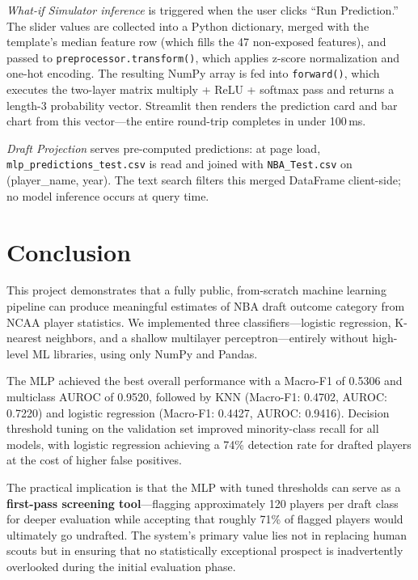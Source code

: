 \textit{What-if Simulator inference} is triggered when the user clicks ``Run Prediction.'' The slider values are collected into a Python dictionary, merged with the template's median feature row (which fills the 47 non-exposed features), and passed to \texttt{preprocessor.transform()}, which applies z-score normalization and one-hot encoding. The resulting NumPy array is fed into \texttt{forward()}, which executes the two-layer matrix multiply + ReLU + softmax pass and returns a length-3 probability vector. Streamlit then renders the prediction card and bar chart from this vector---the entire round-trip completes in under 100\,ms.

\textit{Draft Projection} serves pre-computed predictions: at page load, \texttt{mlp\_predictions\_test.csv} is read and joined with \texttt{NBA\_Test.csv} on (player\_name, year). The text search filters this merged DataFrame client-side; no model inference occurs at query time.



\section{Conclusion}

This project demonstrates that a fully public, from-scratch machine learning pipeline can produce meaningful estimates of NBA draft outcome category from NCAA player statistics. We implemented three classifiers---logistic regression, K-nearest neighbors, and a shallow multilayer perceptron---entirely without high-level ML libraries, using only NumPy and Pandas.

The MLP achieved the best overall performance with a Macro-F1 of 0.5306 and multiclass AUROC of 0.9520, followed by KNN (Macro-F1: 0.4702, AUROC: 0.7220) and logistic regression (Macro-F1: 0.4427, AUROC: 0.9416). Decision threshold tuning on the validation set improved minority-class recall for all models, with logistic regression achieving a 74\% detection rate for drafted players at the cost of higher false positives.

The practical implication is that the MLP with tuned thresholds can serve as a \textbf{first-pass screening tool}---flagging approximately 120 players per draft class for deeper evaluation while accepting that roughly 71\% of flagged players would ultimately go undrafted. The system's primary value lies not in replacing human scouts but in ensuring that no statistically exceptional prospect is inadvertently overlooked during the initial evaluation phase.

